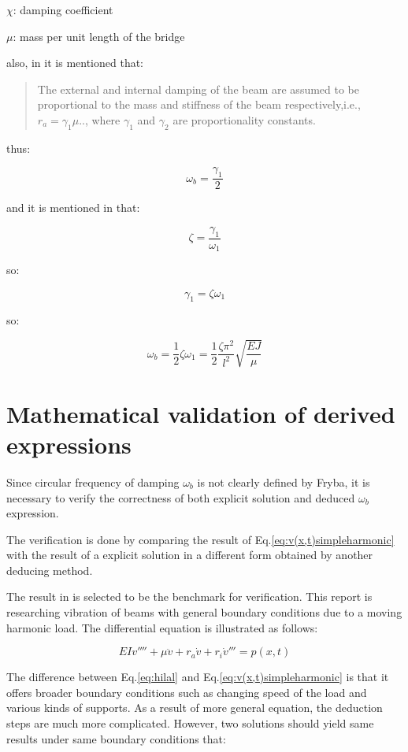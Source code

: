 $\chi$: damping coefficient

$\mu$: mass per unit length of the bridge

also, in \citep[Page.704]{abu2000vibration} it is mentioned that:

\begin{quote}
    The external and internal damping of the beam are assumed to be proportional to the mass and stiffness of the beam respectively,i.e., $r_a = \gamma_1 \mu$.., where $\gamma_1$ and $\gamma_2$ are proportionality constants.
\end{quote}

thus:


\begin{equation}
    \omega_b = \frac{\gamma_1}{2}
\end{equation}

and it is mentioned in \citep[Eq.8]{abu2000vibration} that:

$$\zeta = \frac{\gamma_1}{\omega_1}$$

so:

$$\gamma_1 = \zeta\omega_1$$

so:

$$\omega_b = \frac{1}{2}\zeta\omega_1 = \frac{1}{2}\frac{\zeta\pi^2}{l^2}\sqrt{\frac{EJ}{\mu}}$$


\section{Mathematical validation of derived expressions}

Since circular frequency of damping $\omega_b$ is not clearly defined by Fryba, it is necessary to verify the correctness of both explicit solution and deduced $\omega_b$ expression.

The verification is done by comparing the result of Eq.\ref{eq:v(x,t)simpleharmonic} with the result of a explicit solution in a different form obtained by another deducing method.  

The result in \citet{abu2000vibration} is selected to be the benchmark for verification. This report is researching vibration of beams with general boundary conditions due to a moving harmonic load. The differential equation is illustrated as follows:

\begin{equation}\label{eq:hilal}
    EIv''''+\mu \ddot{v} + r_a \dot{v}+r_i \dot{v}''' = p(x,t)
\end{equation}

The difference between Eq.\ref{eq:hilal} and Eq.\ref{eq:v(x,t)simpleharmonic} is that it offers broader boundary conditions such as changing speed of the load and various kinds of supports. As a result of more general equation, the deduction steps are much more complicated. However, two solutions should yield same results under same boundary conditions that:

